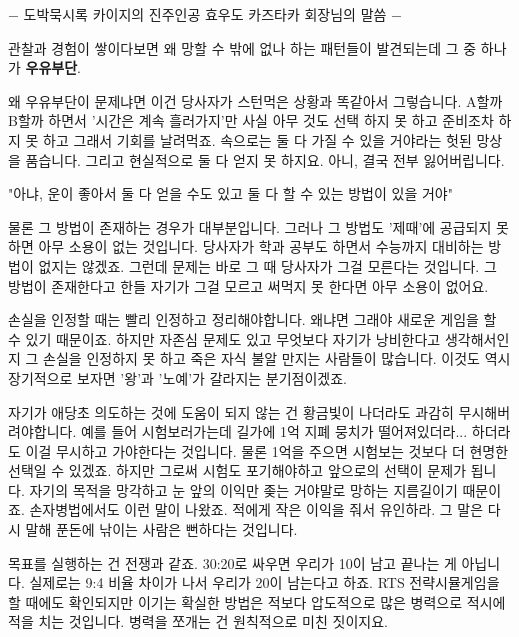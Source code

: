 $-$ 도박묵시록 카이지의 진주인공 효우도 카즈타카 회장님의 말씀 $-$
\vspace{5mm}

관찰과 경험이 쌓이다보면 왜 망할 수 밖에 없나 하는 패턴들이 발견되는데
그 중 하나가 \textbf{우유부단}.
\vspace{5mm}

왜 우유부단이 문제냐면 이건 당사자가 스턴먹은 상황과 똑같아서 그렇습니다.
A할까 B할까 하면서 '시간은 계속 흘러가지'만 사실 아무 것도 선택 하지 못 하고 준비조차 하지 못 하고 그래서 기회를 날려먹죠.
속으로는 둘 다 가질 수 있을 거야라는 헛된 망상을 품습니다. 그리고 현실적으로 둘 다 얻지 못 하지요. 아니, 결국 전부 잃어버립니다.
\vspace{5mm}

"아냐, 운이 좋아서 둘 다 얻을 수도 있고 둘 다 할 수 있는 방법이 있을 거야"
\vspace{5mm}

물론 그 방법이 존재하는 경우가 대부분입니다. 그러나 그 방법도 '제때'에 공급되지 못 하면 아무 소용이 없는 것입니다.
당사자가 학과 공부도 하면서 수능까지 대비하는 방법이 없지는 않겠죠. 그런데 문제는 바로 그 때 당사자가 그걸 모른다는 것입니다.
그 방법이 존재한다고 한들 자기가 그걸 모르고 써먹지 못 한다면 아무 소용이 없어요.
\vspace{5mm}

손실을 인정할 때는 빨리 인정하고 정리해야합니다. 왜냐면 그래야 새로운 게임을 할 수 있기 때문이죠.
하지만 자존심 문제도 있고 무엇보다 자기가 낭비한다고 생각해서인지 그 손실을 인정하지 못 하고 죽은 자식 불알 만지는 사람들이 많습니다.
이것도 역시 장기적으로 보자면 '왕'과 '노예'가 갈라지는 분기점이겠죠.
\vspace{5mm}

자기가 애당초 의도하는 것에 도움이 되지 않는 건 황금빛이 나더라도 과감히 무시해버려야합니다.
예를 들어 시험보러가는데 길가에 1억 지폐 뭉치가 떨어져있더라... 하더라도 이걸 무시하고 가야한다는 것입니다.
물론 1억을 주으면 시험보는 것보다 더 현명한 선택일 수 있겠죠. 하지만 그로써 시험도 포기해야하고 앞으로의 선택이 문제가 됩니다.
자기의 목적을 망각하고 눈 앞의 이익만 좆는 거야말로 망하는 지름길이기 때문이죠.
손자병법에서도 이런 말이 나왔죠. 적에게 작은 이익을 줘서 유인하라.
그 말은 다시 말해 푼돈에 낚이는 사람은 뻔하다는 것입니다.
\vspace{5mm}

목표를 실행하는 건 전쟁과 같죠. 30:20로 싸우면 우리가 10이 남고 끝나는 게 아닙니다. 실제로는 9:4 비율 차이가 나서 우리가 20이 남는다고 하죠.
RTS 전략시뮬게임을 할 때에도 확인되지만 이기는 확실한 방법은 적보다 압도적으로 많은 병력으로 적시에 적을 치는 것입니다.
병력을 쪼개는 건 원칙적으로 미친 짓이지요.
\vspace{5mm}

